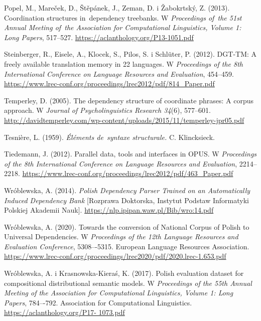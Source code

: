 \documentclass[licencjacka]{pracamgr_Kogni}
\begin{document}
\begin{thebibliography}{99}
        Popel, M., Mareček, D., Štěpánek, J., Zeman, D. i Žabokrtský, Z. (2013).
        Coordination structures in~dependency treebanks.
        W \textit{Proceedings of~the 51st Annual Meeting of~the Association for Computational Linguistics, Volume 1: Long Papers}, 517–527. \url{https://aclanthology.org/P13-1051.pdf}

        Steinberger, R., Eisele, A., Klocek, S., Pilos, S. i Schlüter, P. (2012).
        DGT-TM: A freely available translation memory in 22 languages.
        W \textit{Proceedings of the 8th International Conference on Language Resources and Evaluation}, 454–459. \url{https://www.lrec-conf.org/proceedings/lrec2012/pdf/814_Paper.pdf}

        Temperley, D. (2005). The dependency structure of coordinate phrases: A corpus approach. W \textit{Journal of Psycholinguistics Research 34}(6), 577--601.
        \url{http://davidtemperley.com/wp-content/uploads/2015/11/temperley-jpr05.pdf}

        Tesnière, L. (1959). \textit{Éléments de~syntaxe structurale.} C. Klincksieck.

        Tiedemann, J. (2012).
        Parallel data, tools and interfaces in OPUS. W \textit{Proceedings of the 8th International Conference on Language Resources and Evaluation}, 2214--2218. \url{https://www.lrec-conf.org/proceedings/lrec2012/pdf/463_Paper.pdf}

        Wróblewska, A. (2014). \textit{Polish Dependency Parser Trained on an Automatically Induced Dependency Bank} [Rozprawa Doktorska, Instytut Podstaw Informatyki Polskiej Akademii Nauk]. \url{https://nlp.ipipan.waw.pl/Bib/wro:14.pdf}

        Wróblewska, A. (2020). Towards the conversion of National Corpus of Polish to Universal Dependencies. W \textit{Proceedings of the 12th Language Resources and Evaluation Conference}, 5308–-5315. European Language Resources Association. \url{https://www.lrec-conf.org/proceedings/lrec2020/pdf/2020.lrec-1.653.pdf}

        Wróblewska, A. i Krasnowska-Kieraś, K. (2017). Polish evaluation dataset for compositional distributional semantic models. W \textit{Proceedings of the 55th Annual Meeting of the Association for Computational Linguistics, Volume 1: Long Papers}, 784–-792. Association for Computational Linguistics. \url{https://aclanthology.org/P17- 1073.pdf}
    \end{thebibliography} 
\end{document}
